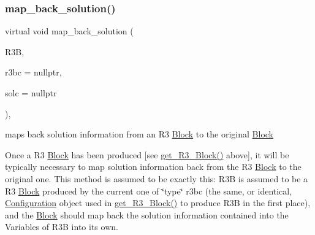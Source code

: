 \mbox{\label{class_s_m_spp__di__unipi__it_1_1_block_a04f0a8a608fcc3ded227c2552f67f1a3}} 
\subsubsection{\texorpdfstring{map\+\_\+back\+\_\+solution()}{map\_back\_solution()}}
{\footnotesize\ttfamily virtual void map\+\_\+back\+\_\+solution (\begin{DoxyParamCaption}\item[{\mbox{\hyperlink{class_s_m_spp__di__unipi__it_1_1_block}{Block}} $\ast$}]{R3B,  }\item[{\mbox{\hyperlink{class_s_m_spp__di__unipi__it_1_1_configuration}{Configuration}} $\ast$}]{r3bc = {\ttfamily nullptr},  }\item[{\mbox{\hyperlink{class_s_m_spp__di__unipi__it_1_1_configuration}{Configuration}} $\ast$}]{solc = {\ttfamily nullptr} }\end{DoxyParamCaption})\hspace{0.3cm}{\ttfamily [inline]}, {\ttfamily [virtual]}}



maps back solution information from an R3 \mbox{\hyperlink{class_s_m_spp__di__unipi__it_1_1_block}{Block}} to the original \mbox{\hyperlink{class_s_m_spp__di__unipi__it_1_1_block}{Block}} 

Once a R3 \mbox{\hyperlink{class_s_m_spp__di__unipi__it_1_1_block}{Block}} has been produced \mbox{[}see \mbox{\hyperlink{class_s_m_spp__di__unipi__it_1_1_block_a2e682f5c0d4a74503c0cb5ab38fb6428}{get\+\_\+\+R3\+\_\+\+Block()}} above\mbox{]}, it will be typically necessary to map solution information back from the R3 \mbox{\hyperlink{class_s_m_spp__di__unipi__it_1_1_block}{Block}} to the original one. This method is assumed to be exactly this\+: R3B is assumed to be a R3 \mbox{\hyperlink{class_s_m_spp__di__unipi__it_1_1_block}{Block}} produced by the current one of \char`\"{}type\char`\"{} r3bc (the same, or identical, \mbox{\hyperlink{class_s_m_spp__di__unipi__it_1_1_configuration}{Configuration}} object used in \mbox{\hyperlink{class_s_m_spp__di__unipi__it_1_1_block_a2e682f5c0d4a74503c0cb5ab38fb6428}{get\+\_\+\+R3\+\_\+\+Block()}} to produce R3B in the first place), and the \mbox{\hyperlink{class_s_m_spp__di__unipi__it_1_1_block}{Block}} should map back the solution information contained into the Variables of R3B into its own.

